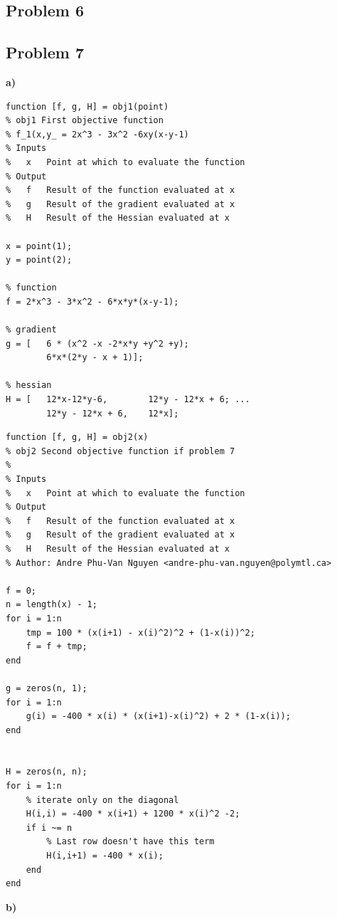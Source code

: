 \subsection{Problem 6}

\incomplete

\subsection{Problem 7}

\textbf{a)}

\begin{lstlisting}[style=Matlab-editor]
function [f, g, H] = obj1(point)
% obj1 First objective function
% f_1(x,y_ = 2x^3 - 3x^2 -6xy(x-y-1)
% Inputs
%   x   Point at which to evaluate the function
% Output
%   f   Result of the function evaluated at x
%   g   Result of the gradient evaluated at x
%   H   Result of the Hessian evaluated at x

x = point(1);
y = point(2);

% function
f = 2*x^3 - 3*x^2 - 6*x*y*(x-y-1);

% gradient
g = [   6 * (x^2 -x -2*x*y +y^2 +y);
        6*x*(2*y - x + 1)];

% hessian
H = [   12*x-12*y-6,        12*y - 12*x + 6; ...
        12*y - 12*x + 6,    12*x];

\end{lstlisting}


\begin{lstlisting}[style=Matlab-editor]
function [f, g, H] = obj2(x)
% obj2 Second objective function if problem 7
%   
% Inputs
%   x   Point at which to evaluate the function
% Output 
%   f   Result of the function evaluated at x
%   g   Result of the gradient evaluated at x
%   H   Result of the Hessian evaluated at x
% Author: Andre Phu-Van Nguyen <andre-phu-van.nguyen@polymtl.ca>

f = 0;
n = length(x) - 1;
for i = 1:n
    tmp = 100 * (x(i+1) - x(i)^2)^2 + (1-x(i))^2;
    f = f + tmp;
end

g = zeros(n, 1);
for i = 1:n
    g(i) = -400 * x(i) * (x(i+1)-x(i)^2) + 2 * (1-x(i));
end


H = zeros(n, n);
for i = 1:n
    % iterate only on the diagonal
    H(i,i) = -400 * x(i+1) + 1200 * x(i)^2 -2;
    if i ~= n
        % Last row doesn't have this term
        H(i,i+1) = -400 * x(i);
    end        
end
\end{lstlisting}

\textbf{b)}

